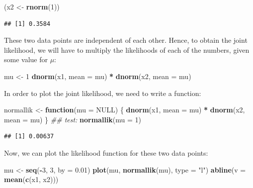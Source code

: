 \documentclass[12pt,]{krantz}
\newenvironment{Shaded}{\begin{snugshade}}{\end{snugshade}}
\newcommand{\CommentTok}[1]{\textcolor[rgb]{0.56,0.35,0.01}{\textit{#1}}}
\newcommand{\ControlFlowTok}[1]{\textcolor[rgb]{0.13,0.29,0.53}{\textbf{#1}}}
\newcommand{\DataTypeTok}[1]{\textcolor[rgb]{0.13,0.29,0.53}{#1}}
\newcommand{\DecValTok}[1]{\textcolor[rgb]{0.00,0.00,0.81}{#1}}
\newcommand{\FloatTok}[1]{\textcolor[rgb]{0.00,0.00,0.81}{#1}}
\newcommand{\KeywordTok}[1]{\textcolor[rgb]{0.13,0.29,0.53}{\textbf{#1}}}
\newcommand{\NormalTok}[1]{#1}
\newcommand{\OperatorTok}[1]{\textcolor[rgb]{0.81,0.36,0.00}{\textbf{#1}}}
\newcommand{\OtherTok}[1]{\textcolor[rgb]{0.56,0.35,0.01}{#1}}
\newcommand{\StringTok}[1]{\textcolor[rgb]{0.31,0.60,0.02}{#1}}
\begin{document}
\begin{Shaded}
\begin{Highlighting}[]
\NormalTok{(x2 <-}\StringTok{ }\KeywordTok{rnorm}\NormalTok{(}\DecValTok{1}\NormalTok{))}
\end{Highlighting}
\end{Shaded}

\begin{verbatim}
## [1] 0.3584
\end{verbatim}

These two data points are independent of each other. Hence, to obtain the joint likelihood, we will have to multiply the likelihoods of each of the numbers, given some value for \(\mu\):

\begin{Shaded}
\begin{Highlighting}[]
\NormalTok{mu <-}\StringTok{ }\DecValTok{1}
\KeywordTok{dnorm}\NormalTok{(x1, }\DataTypeTok{mean =}\NormalTok{ mu) }\OperatorTok{*}\StringTok{ }\KeywordTok{dnorm}\NormalTok{(x2, }\DataTypeTok{mean =}\NormalTok{ mu)}
\end{Highlighting}
\end{Shaded}

In order to plot the joint likelihood, we need to write a function:

\begin{Shaded}
\begin{Highlighting}[]
\NormalTok{normallik <-}\StringTok{ }\ControlFlowTok{function}\NormalTok{(}\DataTypeTok{mu =} \OtherTok{NULL}\NormalTok{) \{}
  \KeywordTok{dnorm}\NormalTok{(x1, }\DataTypeTok{mean =}\NormalTok{ mu) }\OperatorTok{*}\StringTok{ }\KeywordTok{dnorm}\NormalTok{(x2, }\DataTypeTok{mean =}\NormalTok{ mu)}
\NormalTok{\}}
\CommentTok{## test:}
\KeywordTok{normallik}\NormalTok{(}\DataTypeTok{mu =} \DecValTok{1}\NormalTok{)}
\end{Highlighting}
\end{Shaded}

\begin{verbatim}
## [1] 0.00637
\end{verbatim}

Now, we can plot the likelihood function for these two data points:

\begin{Shaded}
\begin{Highlighting}[]
\NormalTok{mu <-}\StringTok{ }\KeywordTok{seq}\NormalTok{(}\OperatorTok{-}\DecValTok{3}\NormalTok{, }\DecValTok{3}\NormalTok{, }\DataTypeTok{by =} \FloatTok{0.01}\NormalTok{)}
\KeywordTok{plot}\NormalTok{(mu, }\KeywordTok{normallik}\NormalTok{(mu), }\DataTypeTok{type =} \StringTok{"l"}\NormalTok{)}
\KeywordTok{abline}\NormalTok{(}\DataTypeTok{v =} \KeywordTok{mean}\NormalTok{(}\KeywordTok{c}\NormalTok{(x1, x2)))}
\end{Highlighting}
\end{Shaded}
\end{document}
